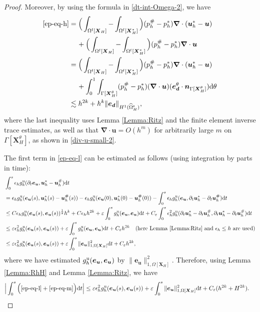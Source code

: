\documentclass[11pt,reqno]{amsart}
\theoremstyle{definition}
\theoremstyle{plain}
\numberwithin{theorem}{section}
\numberwithin{proposition}{section}
\numberwithin{lemma}{section}
\numberwithin{equation}{section}
\newcommand{\bs}[1]{\boldsymbol{#1}}
\newcommand{\uu}[1]  {{\bs{#1}} }
\newcommand{\grad}   { \uu{\nabla}    }
\def\d{\mathrm{d}}
\renewcommand{\(}{\bigl(}
\renewcommand{\)}{\bigr)}
\begin{document}
\begin{proof}
Moreover, by using the formula in \eqref{dt-int-Omega-2}, we have
\begin{align*}
\eqref{ep-eq-h}
&= \Big( \int_{\Omega^{\rm f}[\bs X_H]} - \int_{\Omega^{\rm f}[\bs X_H^*]} \Big) (p_h^\#- p_h^*) \grad\cdot ({\bs u}_h^* - {\bs u}) \\
&\quad\, + \Big( \int_{\Omega^{\rm f}[\bs X_H]} - \int_{\Omega^{\rm f}[\bs X_H^*]} \Big) (p_h^\#- p_h^*) \grad\cdot {\bs u}\\
&= \Big( \int_{\Omega^{\rm f}[\bs X_H]} - \int_{\Omega^{\rm f}[\bs X_H^*]} \Big) (p_h^\#- p_h^*) \grad\cdot ({\bs u}_h^* - {\bs u}) \\
&\quad\, + \int_0^1\int_{\Gamma[\bs X_H^\theta]}  (p_h^\#- p_h^*) (\grad\cdot {\bs u}) ({\bs e}_{\bs d}^\theta \cdot{\bs n}_{\Gamma[\bs X_H^\theta]}) \d\theta \\
&\lesssim h^{2k} + h^k \|{\bs e}_{\bs d}\|_{H^1(\widehat{\Omega}_H^{\rm s})} , 
\end{align*}
where the last inequality uses Lemma \ref{Lemma:Ritz} and the finite element inverse trace estimates, as well as that $\grad\cdot{\bs u} = O(h^m)$ for arbitrarily large $m$ on $\Gamma[{\bs X}_H^\theta]$, as shown in \eqref{div-u-small-2}. 

The first term in \eqref{ep-eq-l} can be estimated as follows (using integration by parts in time):  
\begin{align*}
&\int_0^s \epsilon_h g_h^{\rm u}(\partial_t{\bs e}_{\bs u},{\bs u}_h^*-{\bs u}_h^\#)\d t \\
&= \epsilon_h g_h^{\rm u}({\bs e}_{\bs u}(s),{\bs u}_h^*(s)-{\bs u}_h^\#(s)) - \epsilon_h g_h^{\rm u}({\bs e}_{\bs u}(0),{\bs u}_h^*(0)-{\bs u}_h^\#(0)) 
- \int_0^s \epsilon_h g_h^{\rm u}({\bs e}_{\bs u},\partial_t{\bs u}_h^*-\partial_t{\bs u}_h^\#)\d t \\
&\leq C\epsilon_h g^{\rm u}_h({\bs e}_{\bs u}(s),{\bs e}_{\bs u}(s))^{\frac12} h^k
+ C\epsilon_h h^{2k}
+ \varepsilon \int_0^s g_h^{\rm u}({\bs e}_{\bs u},{\bs e}_{\bs u}) \d t
+ C_\varepsilon \int_0^s \epsilon_h^2 g_h^{\rm u}(\partial_t{\bs u}_h^*-\partial_t{\bs u}_h^\#,\partial_t{\bs u}_h^*-\partial_t{\bs u}_h^\#) \d t \\
&\leq \varepsilon \epsilon_h^2 g^{\rm u}_h({\bs e}_{\bs u}(s),{\bs e}_{\bs u}(s)) 
+ \varepsilon \int_0^s g_h^{\rm u}({\bs e}_{\bs u},{\bs e}_{\bs u}) \d t + C_\varepsilon h^{2k} \quad\mbox{(here Lemma \ref{Lemma:Ritz} and $\epsilon_h\leq h$ are used)} \\
&\leq \varepsilon \epsilon_h^2 g^{\rm u}_h({\bs e}_{\bs u}(s),{\bs e}_{\bs u}(s)) 
+ \varepsilon \int_0^s \|{\bs e}_{\bs u}\|_{1,\Omega[{\bs X}_H]}^2 \d t + C_\varepsilon h^{2k} ,  
\end{align*}
where we have estimated $g_h^{\rm u}({\bs e}_{\bs u},{\bs e}_{\bs u})$ by $\|{\bs e}_{\bs u}\|_{1,\Omega[{\bs X}_H]}^2$. Therefore, using Lemma \ref{Lemma:RhH} and Lemma \ref{Lemma:Ritz}, we have 
\begin{align}
\Big|\int_0^s \Big( \eqref{ep-eq-l}+\eqref{ep-eq-m} \Big) \d t\Big|
&\leq
\varepsilon \epsilon_h^2 g^{\rm u}_h({\bs e}_{\bs u}(s),{\bs e}_{\bs u}(s)) 
+ \varepsilon \int_0^s \|{\bs e}_{\bs u}\|_{1,\Omega[{\bs X}_H]}^2 \d t
+ C_\varepsilon (h^{2k}+H^{2k}) .
\end{align}



\end{proof}
\end{document}
